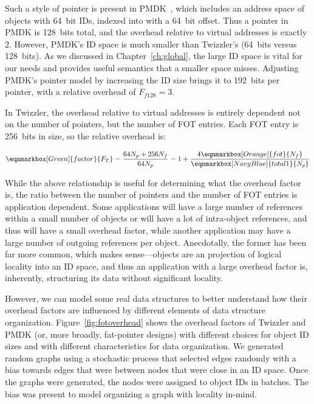 Such a style of pointer is present in PMDK~\cite{pmdk-pointers}, which includes an address space of
objects with 64~bit IDs, indexed into with a 64~bit offset. Thus a pointer in PMDK is 128~bits
total, and the overhead relative to virtual addresses is exactly $2$. However, PMDK's ID space is much
smaller than Twizzler's (64~bits versus 128~bits). As we discussed in Chapter~\ref{ch:global}, the
large ID space is vital for our needs and provides useful semantics that a smaller space misses.
Adjusting PMDK's pointer model by increasing the ID size brings it to 192~bits per pointer, with a
relative overhead of $F_{f128} = 3$.

In Twizzler, the overhead relative to virtual addresses is entirely dependent not on the number of
pointers, but the number of FOT entries. Each FOT entry is 256~bits in size, so the relative
overhead is:

\begin{equation*}
    \eqnmarkbox[Green]{factor}{F_T}
    = \frac{64
        N_p
        + 256
        N_f
    }{64
        N_p
    }
    = 1 + \frac{4
        \eqnmarkbox[Orange]{fot}{N_f}
    }{
        \eqnmarkbox[NavyBlue]{total1}{N_p}
    }
\end{equation*}


While the above relationship is useful for determining what the overhead factor is, the ratio
between the number of pointers and the number of FOT entries is application dependent. Some
applications will have a large number of references within a small number of objects or will have a
lot of intra-object references, and thus will have a small overhead factor, while another
application may have a large number of outgoing references per object. Anecdotally, the former has
been far more common, which makes sense---objects are an projection of logical locality into an ID
space, and thus an application with a large overhead factor is, inherently, structuring its data
without significant locality.

However, we can model some real data structures to better understand how their overhead factors are
influenced by different elements of data structure organization. Figure~\ref{fig:fotoverhead} shows
the overhead factors of Twizzler and PMDK (or, more broadly, fat-pointer designs) with different
choices for object ID sizes and with different characteristics for data organization. We generated
random graphs using a stochastic process that selected edges randomly with a bias towards edges that
were between nodes that were close in an ID space. Once the graphs were generated, the nodes were
assigned to object IDs in batches. The bias was present to model organizing a graph with locality
in-mind.

